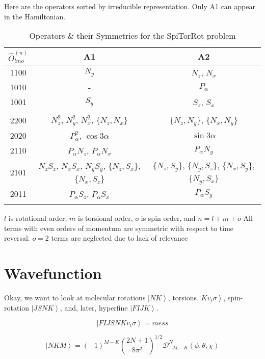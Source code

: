 \documentclass{article}
\begin{document}
Here are the operators sorted by irreducible representation. Only A1 can appear in the Hamiltonian.
\begin{table}[H]
 \centering
 \caption{Operators \& their Symmetries for the SpiTorRot problem}
 \begin{tabular}{c|c c}
  $\hat{O}^{(n)}_{lmo}$& A1 & A2 \\
  \hline
  1100 & $N_{y}$ & $N_{z}$, $N_{x}$ \\
  1010 & - & $P_{\alpha}$ \\
  1001 & $S_{y}$ & $S_{z}$, $S_{x}$ \\
  & &  \\
  2200 & $N_{z}^{2}$, $N_{y}^{2}$, $N_{x}^{2}$, \{$N_{z},N_{x}$\} & \{$N_{z},N_{y}$\}, \{$N_{x},N_{y}$\} \\
  2020 & $P_{\alpha}^{2}$, $\cos3\alpha$ & $\sin3\alpha$\\
  2110 & $P_{\alpha}N_{z}$, $P_{\alpha}N_{x}$ & $P_{\alpha}N_{y}$ \\
  2101 & $N_{z}S_{z}$, $N_{x}S_{x}$, $N_{y}S_{y}$, \{$N_{z},S_{x}$\}, \{$N_{x},S_{z}$\} & \{$N_{z},S_{y}$\}, \{$N_{y},S_{z}$\}, \{$N_{x},S_{y}$\}, \{$N_{y},S_{x}$\} \\
  2011 & $P_{\alpha}S_{z}$, $P_{\alpha}S_{x}$ & $P_{\alpha}S_{y}$ \\
  &  &  \\
  \hline
 \end{tabular}
\end{table}
$l$ is rotational order, $m$ is torsional order, $o$ is spin order, and $n=l+m+o$
All terms with even orders of momentum are symmetric with respect to time reversal. 
$o=2$ terms are neglected due to lack of relevance

\section{Wavefunction}
Okay, we want to look at molecular rotations $\left|NK\right\rangle$, torsions $\left|Kv_{t}\sigma\right\rangle$, spin-rotation $\left|JSNK\right\rangle$, and, later, hyperfine $\left|FIJK\right\rangle$.

\begin{equation}
	\left | F I J S N K v_{t} \sigma  \right\rangle = mess
\end{equation}

\begin{equation}
	\left | N K M \right\rangle = (-1)^{M-K} \left(\frac{2N+1}{8\pi^2}\right)^{1/2}\mathscr{D}^N_{-M,-K}(\phi,\theta,\chi)
\end{equation}
\end{document}
